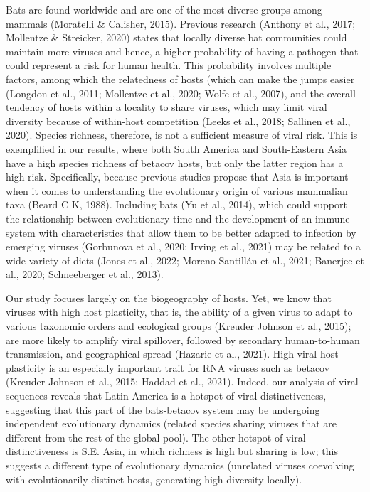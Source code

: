 \documentclass[10pt,oneside]{article}
\begin{document}
Bats are found worldwide and are one of the most diverse groups among
mammals (Moratelli \& Calisher, 2015). Previous research (Anthony et
al., 2017; Mollentze \& Streicker, 2020) states that locally diverse bat
communities could maintain more viruses and hence, a higher probability
of having a pathogen that could represent a risk for human health. This
probability involves multiple factors, among which the relatedness of
hosts (which can make the jumps easier (Longdon et al., 2011; Mollentze
et al., 2020; Wolfe et al., 2007), and the overall tendency of hosts
within a locality to share viruses, which may limit viral diversity
because of within-host competition (Leeks et al., 2018; Sallinen et al.,
2020). Species richness, therefore, is not a sufficient measure of viral
risk. This is exemplified in our results, where both South America and
South-Eastern Asia have a high species richness of betacov hosts, but
only the latter region has a high risk. Specifically, because previous
studies propose that Asia is important when it comes to understanding
the evolutionary origin of various mammalian taxa (Beard C K, 1988).
Including bats (Yu et al., 2014), which could support the relationship
between evolutionary time and the development of an immune system with
characteristics that allow them to be better adapted to infection by
emerging viruses (Gorbunova et al., 2020; Irving et al., 2021) may be
related to a wide variety of diets (Jones et al., 2022; Moreno Santillán
et al., 2021; Banerjee et al., 2020; Schneeberger et al., 2013).

Our study focuses largely on the biogeography of hosts. Yet, we know
that viruses with high host plasticity, that is, the ability of a given
virus to adapt to various taxonomic orders and ecological groups
(Kreuder Johnson et al., 2015); are more likely to amplify viral
spillover, followed by secondary human-to-human transmission, and
geographical spread (Hazarie et al., 2021). High viral host plasticity
is an especially important trait for RNA viruses such as betacov
(Kreuder Johnson et al., 2015; Haddad et al., 2021). Indeed, our
analysis of viral sequences reveals that Latin America is a hotspot of
viral distinctiveness, suggesting that this part of the bats-betacov
system may be undergoing independent evolutionary dynamics (related
species sharing viruses that are different from the rest of the global
pool). The other hotspot of viral distinctiveness is S.E. Asia, in which
richness is high but sharing is low; this suggests a different type of
evolutionary dynamics (unrelated viruses coevolving with evolutionarily
distinct hosts, generating high diversity locally).
\end{document}
